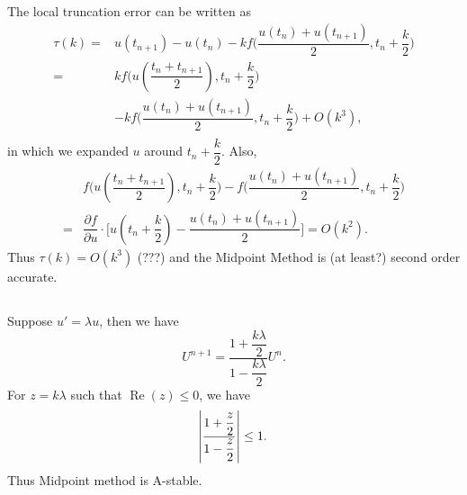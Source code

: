 \documentclass[11pt]{article}
\begin{document}
\pagebreak
\section{}
\subsection{}
The local truncation error can be written as
\begin{equation}\begin{split}
    \tau(k) =& u(t_{n+1})-u(t_n)-kf\Big(\dfrac{u(t_n)+u(t_{n+1})}2,t_n+\dfrac k2\Big)\\
            =& kf\Big(u(\dfrac{t_n+t_{n+1}}2),t_n+\dfrac k2\Big)\\
             & -kf\Big(\dfrac{u(t_n)+u(t_{n+1})}2,t_n+\dfrac k2\Big)+O(k^3),\\
\end{split}\end{equation}
in which we expanded $u$ around $t_n+\dfrac k2$. Also,
\begin{equation}\begin{split}
    &f\Big(u(\dfrac{t_n+t_{n+1}}2),t_n+\dfrac k2\Big) - 
        f\Big(\dfrac{u(t_n)+u(t_{n+1})}2,t_n+\dfrac k2\Big) \\
    =&\dfrac{\partial f}{\partial u}\cdot\Big[u(t_n+\dfrac k2) -
        \dfrac{u(t_n)+u(t_{n+1})}2\Big] = O(k^2).
\end{split}\end{equation}
Thus $\tau(k)=O(k^3)$ (???) and the Midpoint Method is (at least?) second order accurate.

\subsection{}
Suppose $u'=\lambda u$, then we have
\begin{equation}
    U^{n+1} = \dfrac{1+\dfrac{k\lambda}2}{1-\dfrac{k\lambda}2}U^n.
\end{equation}
For $z=k\lambda$ such that $\operatorname{Re}(z)\leq0$, we have 
\begin{equation}
    \abs{\dfrac{1+\dfrac z2}{1-\dfrac z2}} \leq 1.
\end{equation}
Thus Midpoint method is A-stable.
\end{document}

